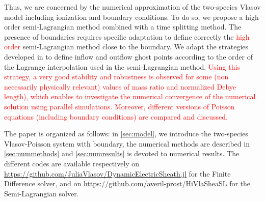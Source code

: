 \documentclass{article}
\numberwithin{equation}{section}
\newcommand{\todo}[1]{{\color{red}\textbf{#1}}}
\begin{document}
Thus, we are concerned by the numerical approximation of the two-species Vlasov model including ionization and boundary conditions.  
To do so, we propose a high order semi-Lagrangian method combined with a time splitting method. 
The presence of boundaries requires specific adaptation to define correctly the \textcolor{red}{high order} 
semi-Lagrangian method close to the boundary. 
We adapt the strategies developed in \cite{coulombelNeumannNumericalBoundary2020, boutinHighOrderNumerical2021} 
to define inflow and outflow ghost points according to the order of the Lagrange interpolation used in the semi-Lagrangian method.  
\textcolor{red}{Using this strategy, a very good stability and robustness is observed for some (non necessarily physically relevant) 
values of mass ratio and normalized Debye length), which enables to investigate the numerical 
convergence of the numerical solution using parallel simulations. 
Moreover, different versions of Poisson equations (including boundary conditions) are compared and discussed.  } 

The paper is organized as follows: in \cref{sec:model}, we introduce the two-species Vlasov-Poisson system with boundary,  
the numerical methods are described in \cref{sec:nummethods} and \cref{sec:numresults} is devoted to numerical results. 
The different codes are available respectively on \href{https://github.com/JuliaVlasov/DynamicElectricSheath.jl}{https://github.com/JuliaVlasov/DynamicElectricSheath.jl} for the Finite Difference solver, and on \href{https://github.com/averil-prost/HiVlaSheaSL}{https://github.com/averil-prost/HiVlaSheaSL} for the Semi-Lagrangian solver. 

%
\end{document}
